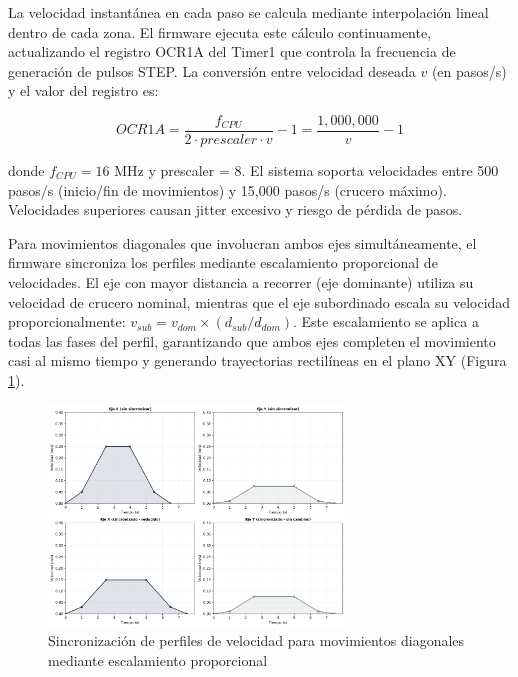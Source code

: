 La velocidad instantánea en cada paso se calcula mediante interpolación lineal dentro de cada zona. El firmware ejecuta este cálculo continuamente, actualizando el registro OCR1A del Timer1 que controla la frecuencia de generación de pulsos STEP. La conversión entre velocidad deseada $v$ (en pasos/s) y el valor del registro es:

\begin{equation}
OCR1A = \frac{f_{CPU}}{2 \cdot prescaler \cdot v} - 1 = \frac{1,000,000}{v} - 1
\end{equation}

donde $f_{CPU} = 16$ MHz y prescaler = 8. El sistema soporta velocidades entre 500 pasos/s (inicio/fin de movimientos) y 15,000 pasos/s (crucero máximo). Velocidades superiores causan jitter excesivo y riesgo de pérdida de pasos.

Para movimientos diagonales que involucran ambos ejes simultáneamente, el firmware sincroniza los perfiles mediante escalamiento proporcional de velocidades. El eje con mayor distancia a recorrer (eje dominante) utiliza su velocidad de crucero nominal, mientras que el eje subordinado escala su velocidad proporcionalmente: $v_{sub} = v_{dom} \times (d_{sub}/d_{dom})$. Este escalamiento se aplica a todas las fases del perfil, garantizando que ambos ejes completen el movimiento casi al mismo tiempo y generando trayectorias rectilíneas en el plano XY (Figura \ref{fig:sincronizacion_multieje}).

\begin{figure}[H]
    \centering
    \includegraphics[width=0.7\textwidth]{imagenes/sincronizacion_multieje.png}
    \caption{Sincronización de perfiles de velocidad para movimientos diagonales mediante escalamiento proporcional}
    \label{fig:sincronizacion_multieje}
\end{figure}
